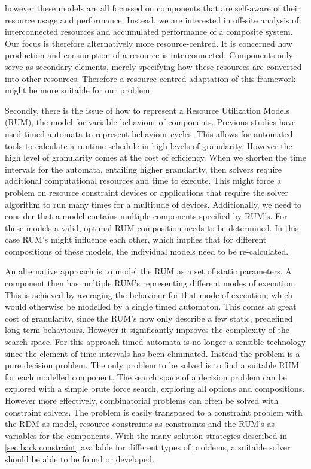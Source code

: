 however these models are all focussed on components that are self-aware of their resource usage and performance. Instead, we are interested in off-site analysis of interconnected resources and accumulated performance of a composite system. Our focus is therefore alternatively more resource-centred. It is concerned how production and consumption of a resource is interconnected. Components only serve as secondary elements, merely specifying how these resources are converted into other resources. Therefore a resource-centred adaptation of this framework might be more suitable for our problem.

Secondly, there is the issue of how to represent a Resource Utilization Models (RUM)\cite{steven-te-brinke}, the model for variable behaviour of components. Previous studies \cite{rum_basis_89, steven-te-brinke} have used timed automata to represent behaviour cycles. This allows for automated tools to calculate a runtime schedule in high levels of granularity. However the high level of granularity comes at the cost of efficiency. When we shorten the time intervals for the automata, entailing higher granularity, then solvers require additional computational resources and time to execute. This might force a problem on resource constraint devices or applications that require the solver algorithm to run many times for a multitude of devices. Additionally, we need to consider that a model contains multiple components specified by RUM's. For these models a valid, optimal RUM composition needs to be determined. In this case RUM's might influence each other, which implies that for different compositions of these models, the individual models need to be re-calculated. %

An alternative approach is to model the RUM as a set of static parameters. A component then has multiple RUM's representing different modes of execution. This is achieved by averaging the behaviour for that mode of execution, which would otherwise be modelled by a single timed automaton. This comes at great cost of granularity, since the RUM's now only describe a few static, predefined long-term behaviours. However it significantly improves the complexity of the search space. For this approach timed automata is no longer a sensible technology since the element of time intervals has been eliminated. Instead the problem is a pure decision problem\cite{decision_problem}. The only problem to be solved is to find a suitable RUM for each modelled component. The search space of a decision problem can be explored with a simple brute force search, exploring all options and compositions. However more effectively, combinatorial problems can often be solved with constraint solvers. The problem is easily transposed to a constraint problem with the RDM as model, resource constraints as constraints and the RUM's as variables for the components. With the many solution strategies described in \ref{sec:back:constraint} available for different types of problems, a suitable solver should be able to be found or developed.

